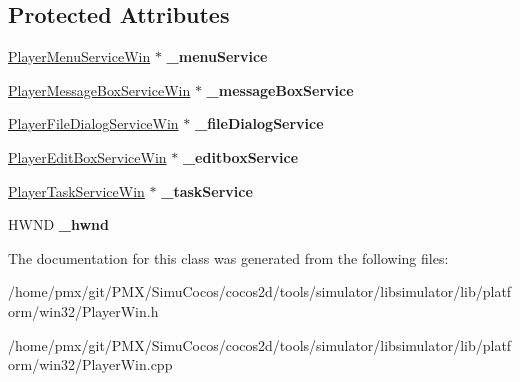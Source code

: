 \subsection*{Protected Attributes}
\begin{DoxyCompactItemize}
\item 
\mbox{\label{classPlayerWin_a67f143ccc1b4a92a01827f611ce5b23f}} 
\hyperlink{classPlayerMenuServiceWin}{Player\+Menu\+Service\+Win} $\ast$ {\bfseries \+\_\+menu\+Service}
\item 
\mbox{\label{classPlayerWin_aaeae95a217b37c311bb44fc2f1483f0f}} 
\hyperlink{classPlayerMessageBoxServiceWin}{Player\+Message\+Box\+Service\+Win} $\ast$ {\bfseries \+\_\+message\+Box\+Service}
\item 
\mbox{\label{classPlayerWin_a863f4deeb00e73a1da52f8dd5d9f6ad2}} 
\hyperlink{classPlayerFileDialogServiceWin}{Player\+File\+Dialog\+Service\+Win} $\ast$ {\bfseries \+\_\+file\+Dialog\+Service}
\item 
\mbox{\label{classPlayerWin_a1a4e3072d4be17c1f65909975d7b7c2b}} 
\hyperlink{classPlayerEditBoxServiceWin}{Player\+Edit\+Box\+Service\+Win} $\ast$ {\bfseries \+\_\+editbox\+Service}
\item 
\mbox{\label{classPlayerWin_a83867c1495212e27a800366c8aa77f79}} 
\hyperlink{classPlayerTaskServiceWin}{Player\+Task\+Service\+Win} $\ast$ {\bfseries \+\_\+task\+Service}
\item 
\mbox{\label{classPlayerWin_a7bbd7e489d4c903ce8a1f43e5a35594a}} 
H\+W\+ND {\bfseries \+\_\+hwnd}
\end{DoxyCompactItemize}


The documentation for this class was generated from the following files\+:\begin{DoxyCompactItemize}
\item 
/home/pmx/git/\+P\+M\+X/\+Simu\+Cocos/cocos2d/tools/simulator/libsimulator/lib/platform/win32/Player\+Win.\+h\item 
/home/pmx/git/\+P\+M\+X/\+Simu\+Cocos/cocos2d/tools/simulator/libsimulator/lib/platform/win32/Player\+Win.\+cpp\end{DoxyCompactItemize}
